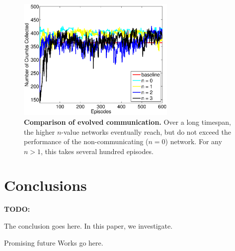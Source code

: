 \documentclass[conference]{IEEEtran}
\begin{document}
\begin{figure}[t]
\centering
\includegraphics[width=3.0in]{./figures/neroevolution/emerg.eps}
\caption{\textbf{Comparison of evolved communication.} Over a long timespan, the higher $n$-value networks eventually reach, but do not exceed the performance of the non-communicating ($n=0$) network. For any $n>1$, this takes several hundred episodes. }
\label{neroevolution:evolved_comunication_results}
\end{figure}



\section{Conclusions} \label{conclusion}
\textbf{TODO: }

The conclusion goes here. In this paper, we investigate.

Promising future Works go here.












\end{document}
